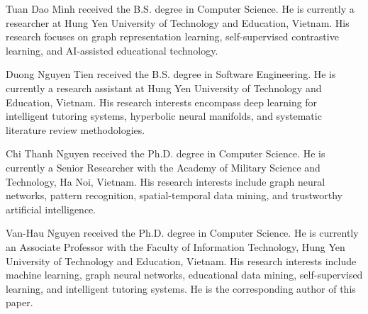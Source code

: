 \documentclass[lettersize,journal]{IEEEtran}
\begin{document}
\begin{IEEEbiographynophoto}{Tuan Dao Minh}
received the B.S. degree in Computer Science. He is currently a researcher at Hung Yen University of Technology and Education, Vietnam. His research focuses on graph representation learning, self-supervised contrastive learning, and AI-assisted educational technology.
\end{IEEEbiographynophoto}

\begin{IEEEbiographynophoto}{Duong Nguyen Tien}
received the B.S. degree in Software Engineering. He is currently a research assistant at Hung Yen University of Technology and Education, Vietnam. His research interests encompass deep learning for intelligent tutoring systems, hyperbolic neural manifolds, and systematic literature review methodologies.
\end{IEEEbiographynophoto}

\begin{IEEEbiographynophoto}{Chi Thanh Nguyen}
received the Ph.D. degree in Computer Science. He is currently a Senior Researcher with the Academy of Military Science and Technology, Ha Noi, Vietnam. His research interests include graph neural networks, pattern recognition, spatial-temporal data mining, and trustworthy artificial intelligence.
\end{IEEEbiographynophoto}

\begin{IEEEbiographynophoto}{Van-Hau Nguyen}
received the Ph.D. degree in Computer Science. He is currently an Associate Professor with the Faculty of Information Technology, Hung Yen University of Technology and Education, Vietnam. His research interests include machine learning, graph neural networks, educational data mining, self-supervised learning, and intelligent tutoring systems. He is the corresponding author of this paper.
\end{IEEEbiographynophoto}
\end{document}
